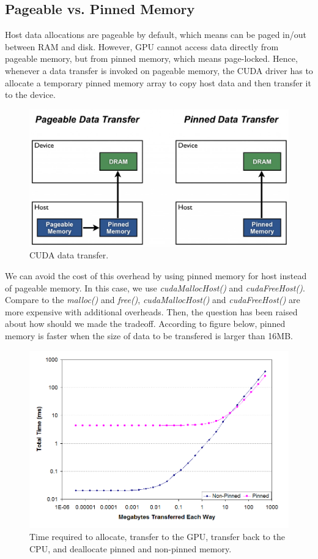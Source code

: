 \documentclass[journal,12pt,onecolumn,draftclsnofoot]{ieeeconf}  %
\begin{document}
\subsection{Pageable vs. Pinned Memory}
Host data allocations are pageable by default, which means can be paged in/out between RAM and disk. However, GPU cannot access data directly from pageable memory, but from pinned memory, which means page-locked. Hence, whenever a data transfer is invoked on pageable memory, the CUDA driver has to allocate a temporary pinned memory array to copy host data and then transfer it to the device. \par
\begin{figure}[h]
	\centering\includegraphics[width=120mm]{pinned.jpg}
	\caption{CUDA data transfer.\cite{Mark}}
	\label{CUDA data transfer.}
\end{figure}
We can avoid the cost of this overhead by using pinned memory for host instead of pageable memory. In this case, we use \textit{cudaMallocHost()} and \textit{cudaFreeHost()}. Compare to the \textit{malloc()} and \textit{free()}, \textit{cudaMallocHost()} and \textit{cudaFreeHost()} are more expensive with additional overheads. Then, the question has been raised about how should we made the tradeoff. According to figure below, pinned memory is faster when the size of data to be transfered is larger than 16MB.  	\cite{Trade_off}\par
\begin{figure}[h]
 	\centering\includegraphics[width=120mm]{pinned_trade_off.png}
 	\caption{Time required to allocate, transfer to the GPU, transfer back to the CPU, and deallocate pinned and non-pinned memory.\cite{Trade_off}}
 	\label{Time required to allocate, transfer to the GPU, transfer back to the CPU, and deallocate pinned and non-pinned memory.}
\end{figure}
\end{document}

